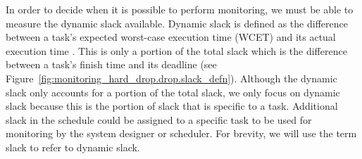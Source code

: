 In order to decide when it is possible to perform monitoring, we must be able
to measure the dynamic slack available.  Dynamic slack is defined as the
difference between a task's expected worst-case execution time (WCET) and its
actual execution time \cite{anantaraman-multi_task_visa-rtss04}. This is only a
portion of the total slack which is the difference between a task's finish time
and its deadline (see Figure~\ref{fig:monitoring_hard_drop.drop.slack_defn}).
Although the dynamic slack only accounts for a portion of the total slack, we
only focus on dynamic slack because this is the portion of slack that is
specific to a task.  Additional slack in the schedule could be assigned to a
specific task to be used for monitoring by the system designer or scheduler.
For brevity, we will use the term slack to refer to dynamic slack.


